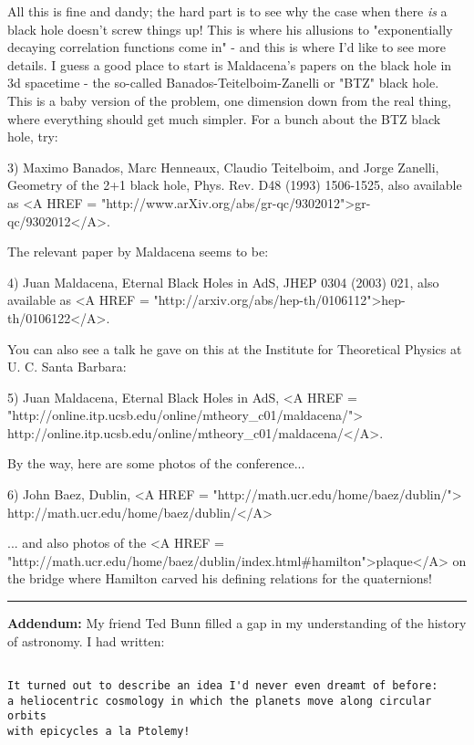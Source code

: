 All this is fine and dandy; the hard part is to see why the case when there 
\emph{is} a black hole doesn't screw things up!  This is where his allusions 
to "exponentially decaying correlation functions come in" - 
and this is 
where I'd like to see more details.  I guess a good place to start is
Maldacena's papers on the black hole in 3d spacetime - the so-called 
Banados-Teitelboim-Zanelli or "BTZ" black hole.  
This is a baby version 
of the problem, one dimension down from the real thing, where everything 
should get much simpler.  For a bunch about the BTZ black hole, try:

3) Maximo Banados, Marc Henneaux, Claudio Teitelboim, and Jorge Zanelli,
Geometry of the 2+1 black hole, 
Phys. Rev. D48 (1993) 1506-1525, also 
available as 
<A HREF = "http://www.arXiv.org/abs/gr-qc/9302012">gr-qc/9302012</A>.

The relevant paper by Maldacena seems to be:

4) Juan Maldacena, Eternal Black Holes in AdS,
JHEP 0304 (2003) 021, also 
available as 
<A HREF = "http://arxiv.org/abs/hep-th/0106112">hep-th/0106122</A>. 

You can also see a talk he gave on this
at the Institute for Theoretical Physics at U. C. Santa Barbara:

5) Juan Maldacena, Eternal Black Holes in AdS, 
<A HREF = "http://online.itp.ucsb.edu/online/mtheory_c01/maldacena/">
http://online.itp.ucsb.edu/online/mtheory_c01/maldacena/</A>.

By the way, here are some photos of the conference...

6) John Baez, Dublin, <A HREF = "http://math.ucr.edu/home/baez/dublin/">
http://math.ucr.edu/home/baez/dublin/</A>

... and also 
photos of the <A HREF = "http://math.ucr.edu/home/baez/dublin/index.html#hamilton">plaque</A> on the bridge where Hamilton carved his defining relations for 
the quaternions!
 
\par\noindent\rule{\textwidth}{0.4pt}
\textbf{Addendum:} My friend Ted Bunn filled a gap in my 
understanding of the history of astronomy.  I had written:


\begin{verbatim}

It turned out to describe an idea I'd never even dreamt of before: 
a heliocentric cosmology in which the planets move along circular orbits 
with epicycles a la Ptolemy!  
\end{verbatim}
    

